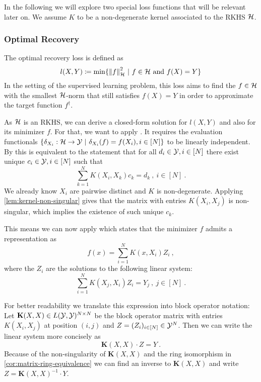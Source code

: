 In the following we will explore two special loss functions that will be relevant later on.
We assume $K$ to be a non-degenerate kernel associated to the RKHS $\mathcal{H}$.

\subsubsection{Optimal Recovery}
\label{sec:optimal-recovery}

The optimal recovery loss is defined as
\begin{equation}
\label{eq:optimal-recovery-loss}
l(X, Y) \coloneqq \min\{\norm{f}_{\mathcal{H}}^2 ~|~ f\in \mathcal{H} \text{~and~} f(X) = Y\}
\end{equation}
In the setting of the supervised learning problem, this loss aims to find the $f \in \mathcal{H}$ with the smallest $\mathcal{H}$-norm that still satisfies $f(X) = Y$ in order to approximate the target function $f^\dagger$.

As $\mathcal{H}$ is an RKHS, we can derive a closed-form solution for $l(X, Y)$ and also for its minimizer $f$.
For that, we want to apply \cite[Theorem 3.1]{micchelli05}.
It requires the evaluation functionals $\{\delta_{X_i}: \cH \rightarrow \cY \ |\ \delta_{X_i}(f) = f(X_i), i \in [N]\}$ to be linearly independent.
By \cite[Lemma 3.1]{micchelli05} this is equivalent to the statement that for all $d_i \in \mathcal{Y}, i \in [N]$ there exist unique $c_i \in \mathcal{Y}, i \in [N]$ such that
\begin{equation}
	\sum_{k=1}^N K(X_i, X_k) c_k = d_k \ ,\ i \in [N] \ .
\end{equation}
We already know $X_i$ are pairwise distinct and $K$ is non-degenerate.
Applying \cref{lem:kernel-non-singular} gives that the matrix with entries $K(X_i, X_j)$ is non-singular, which implies the existence of such unique $c_k$.

This means we can now apply \cite[Theorem 3.1]{micchelli05} which states that the minimizer $f$ admits a representation as 
\begin{equation}
	\label{eq:optimal-recovery-f}
	f(x) = \sum_{i=1}^N K(x, X_i) Z_i \ ,
\end{equation}
where the $Z_i$ are the solutions to the following linear system:
\begin{equation}
	\sum_{i=1}^{N} K(X_j, X_i) Z_i = Y_j \ ,\ j \in [N] \ .
\end{equation}

For better readability we translate this expression into block operator notation:
Let $\mathbf{K}(X, X) \in L(\mathcal{Y}, \mathcal{Y})^{N\times N}$ be the block operator matrix with entries $K(X_i, X_j)$ at position $(i, j)$ and $Z = (Z_i)_{i \in [N]} \in \mathcal{Y}^N$.
Then we can write the linear system more concisely as 
\begin{equation}
	\mathbf{K}(X, X) \cdot Z = Y \ .
\end{equation}
Because of the non-singularity of $\mathbf{K}(X, X)$ and the ring isomorphism in \cref{cor:matrix-ring-equivalence} we can find an inverse to $\mathbf{K}(X, X)$ and write $Z = \mathbf{K}(X, X)^{-1} \cdot Y$.

